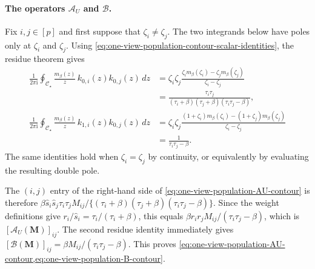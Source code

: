 \documentclass[11pt]{article}
\begin{document}
\paragraph{The operators $\mathcal A_U$ and $\mathcal B$.}
Fix $i,j\in[p]$ and first suppose that $\zeta_i\ne\zeta_j$.  The two
integrands below have poles only at $\zeta_i$ and $\zeta_j$.  Using
\cref{eq:one-view-population-contour-scalar-identities}, the residue theorem
gives
\begin{align*}
  \frac{1}{2\pi\mathrm i}
  \oint_{\mathcal C_\star}
  \frac{m_\beta(z)}{z}\,
  k_{0,i}(z)k_{0,j}(z)\,dz
  &=
  \zeta_i\zeta_j
  \frac{
    \zeta_i m_\beta(\zeta_i)
    -
    \zeta_j m_\beta(\zeta_j)
  }{
    \zeta_i-\zeta_j
  } \\
  &=
  \frac{
    \tau_i\tau_j
  }{
    (\tau_i+\beta)(\tau_j+\beta)
    (\tau_i\tau_j-\beta)
  },
  \\
  \frac{1}{2\pi\mathrm i}
  \oint_{\mathcal C_\star}
  \frac{m_\beta(z)}{z}\,
  k_{1,i}(z)k_{0,j}(z)\,dz
  &=
  \zeta_i\zeta_j
  \frac{
    (1+\zeta_i)m_\beta(\zeta_i)
    -
    (1+\zeta_j)m_\beta(\zeta_j)
  }{
    \zeta_i-\zeta_j
  } \\
  &=
  \frac{1}{\tau_i\tau_j-\beta}.
\end{align*}
The same identities hold when $\zeta_i=\zeta_j$ by continuity, or
equivalently by evaluating the resulting double pole.

The $(i,j)$ entry of the right-hand side of
\cref{eq:one-view-population-AU-contour} is therefore
$\beta \widehat s_i\widehat s_j\tau_i\tau_j M_{ij}/
\{(\tau_i+\beta)(\tau_j+\beta)(\tau_i\tau_j-\beta)\}$.
Since the weight definitions give
$r_i/\widehat s_i=\tau_i/(\tau_i+\beta)$, this equals
$\beta r_ir_jM_{ij}/(\tau_i\tau_j-\beta)$, which is
$[\mathcal A_U(\bm{M})]_{ij}$.  The second residue identity immediately
gives
$[\mathcal B(\bm{M})]_{ij}
=\beta M_{ij}/(\tau_i\tau_j-\beta)$.
This proves
\cref{eq:one-view-population-AU-contour,eq:one-view-population-B-contour}.
\end{document}
